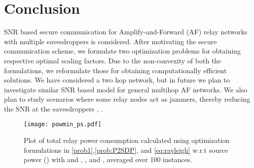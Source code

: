 \documentclass[journal,,draftclsnofoot letterpaper, onecolumn]{IEEEtran}
\begin{document}
\section{Conclusion}
\label{sec:concl}
SNR based secure communication for Amplify-and-Forward (AF) relay networks with multiple eavesdroppers is considered. After motivating the secure communication scheme, we formulate two optimization problems for obtaining respective optimal scaling factors. Due to the non-convexity of both the formulations, we reformulate those for obtaining computationally efficient solutions. We have considered a two hop network, but in future we plan to investigate similar SNR based model for general multihop AF networks. We also plan to study scenarios where some relay nodes act as jammers, thereby reducing the SNR at the eavesdroppers \cite{sarma}, \cite{sankararaman2012}.

\begin{figure}[!t]
\centering
\texttt{[image: powmin\_ps.pdf]}
\caption{Plot of total relay power consumption calculated using optimization formulations in \eqref{prob1},\eqref{prob:P2SDP}, and \eqref{eq:rayleigh} w.r.t source power () with  and , ,  and , averaged over 100 instances.}
\label{fig_powmin}
\end{figure}
\end{document}
